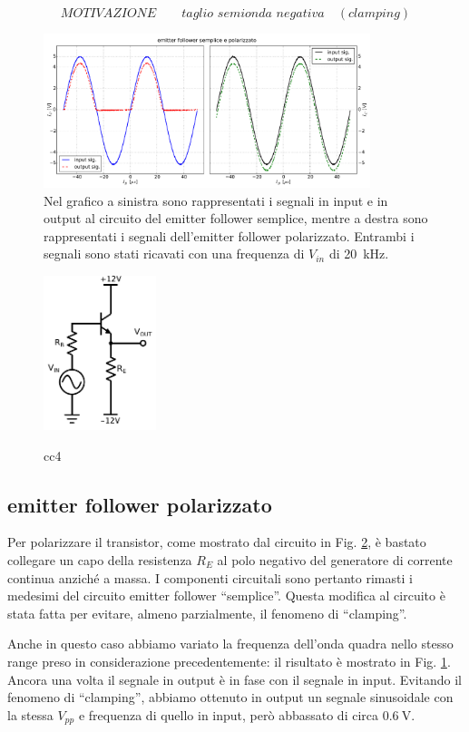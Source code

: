 $$MOTIVAZIONE \qquad taglio \,\, semionda \,\, negativa \quad (clamping)$$
\begin{figure}[h]
\centering
	\includegraphics[width=0.85\textwidth]{cc3+cc4.pdf}
	\caption{Nel grafico a sinistra sono rappresentati i segnali in input e in output al circuito del emitter follower semplice, mentre a destra sono rappresentati i segnali dell'emitter follower polarizzato. Entrambi i segnali sono stati ricavati con una frequenza di $V_{in}$ di \SI{20}{\kilo\hertz}.}
	\label{fig:cc3+cc4}
\end{figure}

\begin{figure}
	\caption{cc4}
	\includegraphics[height=45mm]{cc4.pdf}
	\label{fig:cc4}
\end{figure}

\subsection{emitter follower polarizzato}
Per polarizzare il transistor, come mostrato dal circuito in Fig. \ref{fig:cc4}, è bastato collegare un capo della resistenza $R_E$ al polo negativo del generatore di corrente continua anziché a massa.
I componenti circuitali sono pertanto rimasti i medesimi del circuito emitter follower ``semplice''.
Questa modifica al circuito è stata fatta per evitare, almeno parzialmente, il fenomeno di ``clamping''.

Anche in questo caso abbiamo variato la frequenza dell'onda quadra nello stesso range preso in considerazione precedentemente: il risultato è mostrato in Fig. \ref{fig:cc3+cc4}.
Ancora una volta il segnale in output è in fase con il segnale in input.
Evitando il fenomeno di ``clamping'', abbiamo ottenuto in output un segnale sinusoidale con la stessa $V_{pp}$ e frequenza di quello in input, però abbassato di circa $\SI{0.6}{\volt}$.

